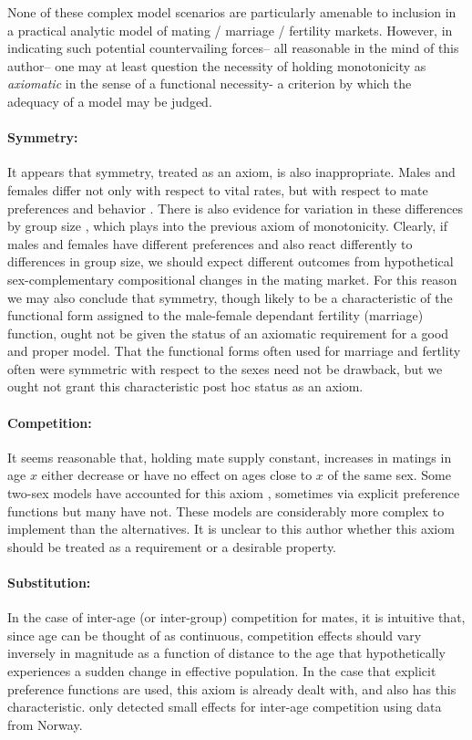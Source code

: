  None of these complex model scenarios are particularly amenable to inclusion in
 a practical analytic model of mating / marriage / fertility markets. However,
 in indicating such potential countervailing forces-- all reasonable in the mind
 of this author-- one may at least question the necessity of holding
 monotonicity as \textit{axiomatic} in the sense of a functional necessity- a
 criterion by which the adequacy of a model may be judged. 

\paragraph{Symmetry:} It appears that symmetry, treated as an axiom, is also
inappropriate. Males and females differ not only with respect to vital rates,
but with respect to mate preferences and behavior \citep{buss1989sex}. There is
also evidence for variation in these differences by group size
\citep{fisman2006gender}, which plays into the previous axiom of monotonicity.
Clearly, if males and females have different preferences and also react
differently to differences in group size, we should expect different outcomes
from hypothetical sex-complementary compositional changes in the mating market.
For this reason we may also conclude that symmetry, though likely to be a
characteristic of the functional form assigned to the male-female
dependant fertility (marriage) function, ought not be given the status of an
axiomatic requirement for a good and proper model. That the functional forms
often used for marriage and fertlity often were symmetric with respect to the
sexes need not be drawback, but we ought not grant this characteristic post hoc
status as an axiom.

\paragraph{Competition:} It seems reasonable that, holding mate supply constant,
increases in matings in age $x$ either decrease or have no effect on ages
close to $x$ of the same sex. Some two-sex models have accounted for this axiom
\citep{henry1972nuptiality, mc1975models, choo2006estimating}, sometimes via
explicit preference functions \citep{parlett1972can, pollard1993interaction} but
many have not. These models are considerably more complex to implement than the 
alternatives. It is unclear to this author whether this axiom should be treated
as a requirement or a desirable property. 

\paragraph{Substitution:} In the case of inter-age (or inter-group) competition
for mates, it is intuitive that, since age can be thought of as
continuous, competition effects should vary inversely in magnitude as a function
of distance to the age that hypothetically experiences a sudden change in
effective population. In the case that explicit preference functions are used, this axiom
is already dealt with, and \citet{choo2006estimating} also has this
characteristic. \citet{keilman1999female} only
detected small effects for inter-age competition using data from Norway.

